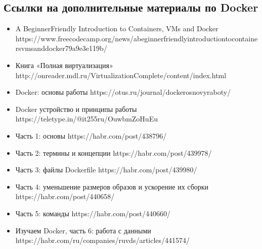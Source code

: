 \documentclass[letterpaper,10pt,russian]{sphinxmanual}
\begin{document}
\subsection{Ссылки на дополнительные материалы по Docker}
\label{\detokenize{educational_materials/docker_base/content:id13}}\begin{itemize}
\item {} 
\sphinxAtStartPar
A Beginner\sphinxhyphen{}Friendly Introduction to Containers, VMs and Docker https://www.freecodecamp.org/news/a\sphinxhyphen{}beginner\sphinxhyphen{}friendly\sphinxhyphen{}introduction\sphinxhyphen{}to\sphinxhyphen{}containers\sphinxhyphen{}vms\sphinxhyphen{}and\sphinxhyphen{}docker\sphinxhyphen{}79a9e3e119b/

\item {} 
\sphinxAtStartPar
Книга «Полная виртуализация» http://onreader.mdl.ru/VirtualizationComplete/content/index.html

\item {} 
\sphinxAtStartPar
Docker: основы работы https://otus.ru/journal/docker\sphinxhyphen{}osnovy\sphinxhyphen{}raboty/

\item {} 
\sphinxAtStartPar
Docker \sphinxhyphen{} устройство и принципы работы https://teletype.in/@it255ru/OuwbmZoHuEu

\item {} 
\sphinxAtStartPar
Часть 1: основы https://habr.com/post/438796/

\item {} 
\sphinxAtStartPar
Часть 2: термины и концепции https://habr.com/post/439978/

\item {} 
\sphinxAtStartPar
Часть 3: файлы Dockerfile https://habr.com/post/439980/

\item {} 
\sphinxAtStartPar
Часть 4: уменьшение размеров образов и ускорение их сборки https://habr.com/post/440658/

\item {} 
\sphinxAtStartPar
Часть 5: команды https://habr.com/post/440660/

\item {} 
\sphinxAtStartPar
Изучаем Docker, часть 6: работа с данными https://habr.com/ru/companies/ruvds/articles/441574/

\end{itemize}

\sphinxstepscope
\end{document}
